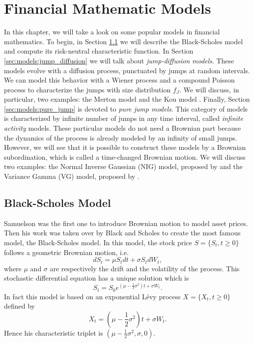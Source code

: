 \chapter{Financial Mathematic Models}
\label{sec:models}


In this chapter, we will take a look on some popular models in financial mathematics. To begin, in Section \ref{sec:models:BS} we will describe the Black-Scholes model \citeyearpar{BS73} \cite{BS73} and compute its risk-neutral characteristic function. In Section \ref{sec:models:jump_diffusion} we will talk about \textit{jump-diffusion models}. These models evolve with a diffusion process, punctuated by jumps at random intervals. We can model this behavior with a Wiener process and a compound Poisson process to characterize the jumps with size distribution $f_J$. We will discuss, in particular, two examples: the Merton model \citeyearpar{Mer76} \cite{Mer76} and the Kou model \citeyearpar{Kou02} \cite{Kou02}. Finally, Section \ref{sec:models:pure_jump} is devoted to \textit{pure jump models}. This category of models is characterized by infinite number of jumps in any time interval, called \textit{infinite activity} models. These particular models do not need a Brownian part because the dynamics of the process is already modeled by an infinity of small jumps. However, we will see that it is possible to construct these models by a Brownian subordination, which is called a time-changed Brownian motion. We will discuss two examples: the Normal Inverse Gaussian (NIG) model, proposed by \citeauthor{Bar97b} \citeyearpar{Bar97b} \cite{Bar97b} and the Variance Gamma (VG) model, proposed by \citeauthor{MCC98} \citeyearpar{MCC98} \cite{MCC98}.

\section{Black-Scholes Model}
\label{sec:models:BS}
Samuelson \citeyearpar{Sam65} was the first one to introduce Brownian motion to model asset prices. Then his work was taken over by Black and Scholes \citeyearpar{BS73} to create the most famous model, the Black-Scholes model. In this model, the stock price $S=\{S_t,t\geq0\}$ follows a geometric Brownian motion, i.e.
$$dS_t = \mu S_t dt + \sigma S_t dW_t,$$
where $\mu$ and $\sigma$ are respectively the drift and the volatility of the process. This stochastic differential equation has a unique solution which is
$$S_t = S_0e^{\left(\mu-\frac{1}{2}\sigma^2\right)t+\sigma W_t}.$$
In fact this model is based on an exponential L\'evy process $X=\{X_t,t\geq0\}$ defined by
$$X_t = \left(\mu - \frac{1}{2}\sigma^2\right)t + \sigma W_t.$$
Hence his characteristic triplet is $\left(\mu-\frac{1}{2}\sigma^2,\sigma,0\right)$.

